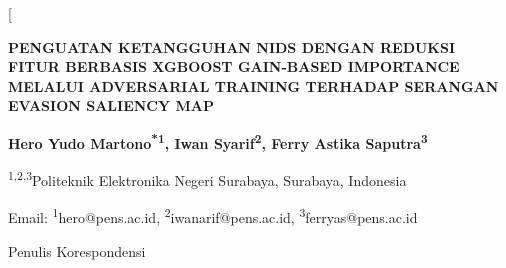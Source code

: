 \documentclass[10pt,twocolumn,a4paper]{extarticle}
\begin{document}
\twocolumn[
  \begin{@twocolumnfalse}
  \begin{center}
    {\fontsize{12}{14}\selectfont \bfseries \MakeUppercase{Penguatan Ketangguhan NIDS dengan Reduksi Fitur Berbasis XGBoost Gain-based Importance melalui Adversarial Training terhadap Serangan Evasion Saliency Map}\par}
    \vspace{6pt}
    {\fontsize{10}{12}\selectfont \bfseries Hero Yudo Martono\textsuperscript{*1}, Iwan Syarif\textsuperscript{2}, Ferry Astika Saputra\textsuperscript{3}\par}
    \vspace{4pt}
    {\fontsize{10}{12}\selectfont \textsuperscript{1,2,3}Politeknik Elektronika Negeri Surabaya, Surabaya, Indonesia\par}
    {\fontsize{10}{12}\selectfont Email: \textsuperscript{1}hero@pens.ac.id, \textsuperscript{2}iwanarif@pens.ac.id, \textsuperscript{3}ferryas@pens.ac.id\par}
    {\fontsize{10}{12}\selectfont *Penulis Korespondensi\par}
    \vspace{10pt}
  \end{center}


\end{@twocolumnfalse}
\end{document}
